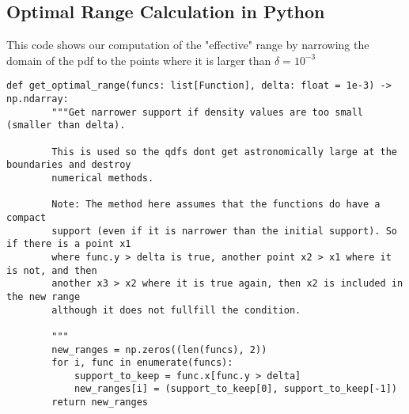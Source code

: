 \subsection{Optimal Range Calculation in Python}
\label{sec:code_optimal_range}
This code shows our computation of the "effective" range by narrowing the domain
of the pdf to the points where it is larger than $\delta = 10^{-3}$
\begin{lstlisting}[style=python]
    def get_optimal_range(funcs: list[Function], delta: float = 1e-3) -> np.ndarray:
        """Get narrower support if density values are too small (smaller than delta).

        This is used so the qdfs dont get astronomically large at the boundaries and destroy
        numerical methods.

        Note: The method here assumes that the functions do have a compact
        support (even if it is narrower than the initial support). So if there is a point x1
        where func.y > delta is true, another point x2 > x1 where it is not, and then
        another x3 > x2 where it is true again, then x2 is included in the new range
        although it does not fullfill the condition.

        """
        new_ranges = np.zeros((len(funcs), 2))
        for i, func in enumerate(funcs):
            support_to_keep = func.x[func.y > delta]
            new_ranges[i] = (support_to_keep[0], support_to_keep[-1])
        return new_ranges
\end{lstlisting}

\newpage
